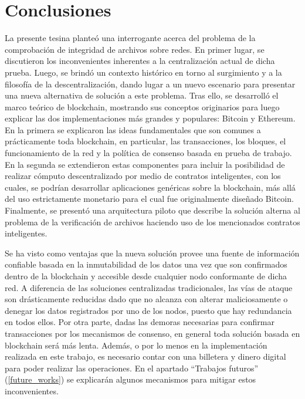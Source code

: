 \section{Conclusiones}
\label{conclusion}

La presente tesina planteó una interrogante acerca del problema de la comprobación de integridad de archivos sobre redes. En primer lugar, se discutieron los inconvenientes inherentes a la centralización actual de dicha prueba. Luego, se brindó un contexto histórico en torno al surgimiento y a la filosofía de la descentralización, dando lugar a un nuevo escenario para presentar una nueva alternativa de solución a este problema. Tras ello, se desarrolló el marco teórico de blockchain, mostrando sus conceptos originarios para luego explicar las dos implementaciones más grandes y populares: Bitcoin y Ethereum. En la primera se explicaron las ideas fundamentales que son comunes a prácticamente toda blockchain, en particular, las transacciones, los bloques, el funcionamiento de la red y la política de consenso basada en prueba de trabajo. En la segunda se extendieron estas componentes para incluir la posibilidad de realizar cómputo descentralizado por medio de contratos inteligentes, con los cuales, se podrían desarrollar aplicaciones genéricas sobre la blockchain, más allá del uso estrictamente monetario para el cual fue originalmente diseñado Bitcoin. Finalmente, se presentó una arquitectura piloto que describe la solución alterna al problema de la verificación de archivos haciendo uso de los mencionados contratos inteligentes.

Se ha visto como ventajas que la nueva solución provee una fuente de información confiable basada en la inmutabilidad de los datos una vez que son confirmados dentro de la blockchain y accesible desde cualquier nodo conformante de dicha red. A diferencia de las soluciones centralizadas tradicionales, las vías de ataque son drásticamente reducidas dado que no alcanza con alterar maliciosamente o denegar los datos registrados por uno de los nodos, puesto que hay redundancia en todos ellos. Por otra parte, dadas las demoras necesarias para confirmar transacciones por los mecanismos de consenso, en general toda solución basada en blockchain será más lenta. Además, o por lo menos en la implementación realizada en este trabajo, es necesario contar con una billetera y dinero digital para poder realizar las operaciones. En el apartado ``Trabajos futuros'' (\ref{future_works}) se explicarán algunos mecanismos para mitigar estos inconvenientes.

